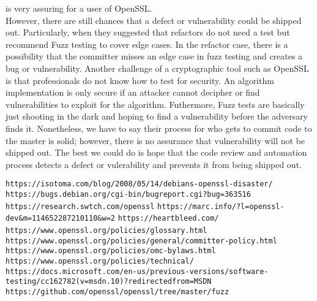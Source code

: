 \documentclass[conference]{IEEEtran}
\begin{document}
    is very assuring for a user of OpenSSL.\\
    \quad However, there are still chances that
    a defect or vulnerability could be shipped out. Particularly, when
    they suggested that refactors do not need a test but
    recommend Fuzz testing to cover edge cases. In the
    refactor case, there is a possibility that
    the committer misses an edge case in fuzz
    testing and creates a bug or vulnerability.
    Another challenge of a cryptographic tool
    such as OpenSSL is that professionals do not know how to
    test for security. An algorithm implementation is
    only secure if an attacker cannot decipher or find
    vulnerabilities to exploit for the algorithm. Futhermore,
    Fuzz tests are basically just shooting in the dark
    and hoping to find a vulnerability before
    the adversary finds it.
    Nonetheless, we have to say their process
    for who gets to commit code to the master is solid; however,
    there is no assurance that vulnerability will not be shipped out.
    The best we could do is hope that the code review and automation
    process detects a defect or vulerability and prevents it from being
    shipped out.
\begin{thebibliography}{00}
 \verb|https://isotoma.com/blog/2008/05/14/debians-openssl-disaster/|
 \verb|https://bugs.debian.org/cgi-bin/bugreport.cgi?bug=363516|
 \verb|https://research.swtch.com/openssl|
 \verb|https://marc.info/?l=openssl-dev&m=114652287210110&w=2|
  \verb|https://heartbleed.com/|
 \verb|https://www.openssl.org/policies/glossary.html|
 \verb| https://www.openssl.org/policies/general/committer-policy.html|
 \verb|https://www.openssl.org/policies/omc-bylaws.html|
 \verb|https://www.openssl.org/policies/technical/|
 \verb|https://docs.microsoft.com/en-us/previous-versions/software-testing/cc162782(v=msdn.10)?redirectedfrom=MSDN|
 \verb|https://github.com/openssl/openssl/tree/master/fuzz|
\end{thebibliography}
\end{document}

